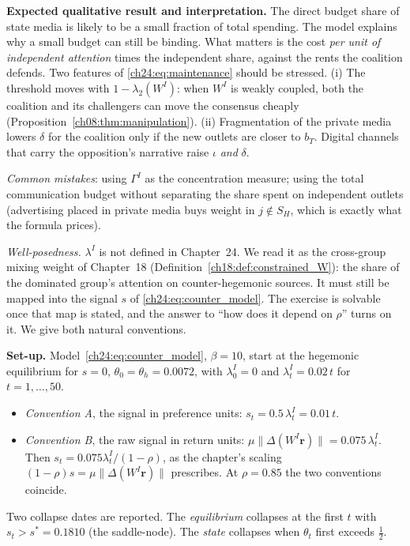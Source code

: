 \documentclass[../solutions_manual.tex]{subfiles}
\begin{document}
 \textbf{Expected qualitative result and interpretation.} The direct budget share of state media is likely to be a small fraction of total spending. The model explains why a small budget can still be binding. What matters is the cost \emph{per unit of independent attention} times the independent share, against the rents the coalition defends. Two features of \eqref{ch24:eq:maintenance} should be stressed. (i) The threshold moves with $1-\lambda_2(W^I)$: when $W^I$ is weakly coupled, both the coalition and its challengers can move the consensus cheaply (Proposition~\ref{ch08:thm:manipulation}). (ii) Fragmentation of the private media lowers $\delta$ for the coalition only if the new outlets are closer to $b_T$. Digital channels that carry the opposition's narrative raise $\iota$ \emph{and} $\delta$.

\emph{Common mistakes}: using $\Gamma^I$ as the concentration measure; using the total communication budget without separating the share spent on independent outlets (advertising placed in private media buys weight in $j \notin S_H$, which is exactly what the formula prices).


\emph{Well-posedness.} $\lambda^I$ is not defined in Chapter~24. We read it as the cross-group mixing weight of Chapter~18 (Definition~\ref{ch18:def:constrained_W}): the share of the dominated group's attention on counter-hegemonic sources. It must still be mapped into the signal $s$ of \eqref{ch24:eq:counter_model}. The exercise is solvable once that map is stated, and the answer to ``how does it depend on $\rho$'' turns on it. We give both natural conventions.

 \textbf{Set-up.} Model~\eqref{ch24:eq:counter_model}, $\beta = 10$, start at the hegemonic equilibrium for $s = 0$, $\theta_0 = \theta_h = 0.0072$, with $\lambda^I_0 = 0$ and $\lambda^I_t = 0.02\,t$ for $t = 1, \dots, 50$.
\begin{itemize}
\item \emph{Convention A}, the signal in preference units: $s_t = 0.5\,\lambda^I_t = 0.01\,t$.
\item \emph{Convention B}, the raw signal in return units: $\mu\|\Delta(W^I\mathbf{r})\| = 0.075\,\lambda^I_t$. Then $s_t = 0.075\lambda^I_t/(1-\rho)$, as the chapter's scaling $(1-\rho)s = \mu\|\Delta(W^I\mathbf{r})\|$ prescribes. At $\rho = 0.85$ the two conventions coincide.
\end{itemize}
Two collapse dates are reported. The \emph{equilibrium} collapses at the first $t$ with $s_t > s^* = 0.1810$ (the saddle-node). The \emph{state} collapses when $\theta_t$ first exceeds $\tfrac12$.
\end{document}
